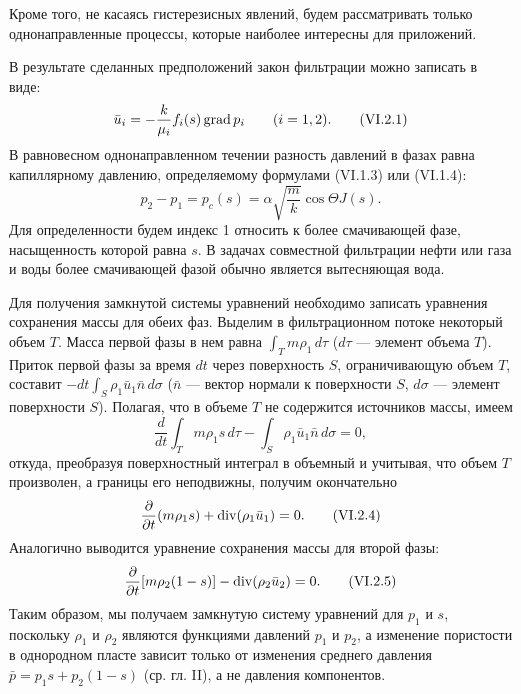 Кроме того, не касаясь гистерезисных явлений, будем рассматривать только однонаправленные процессы, которые наиболее интересны для приложений.

В результате сделанных предположений закон фильтрации можно записать в виде:
\begin{equation}\bar u_i=-\frac{k}{\mu_i}f_i(s)\operatorname{grad} p_i\qquad(i=1,2).\tag{VI.2.1}\label{q11:eq-VI-2-1}\end{equation}
В равновесном однонаправленном течении разность давлений в фазах равна капиллярному давлению, определяемому формулами (VI.1.3) или (VI.1.4):
\begin{equation}p_2-p_1=p_c(s)=\alpha\sqrt{\frac{m}{k}}\cos\Theta J(s).\tag{VI.2.2}\label{q11:eq-VI-2-2}\end{equation}
Для определенности будем индекс 1 относить к более смачивающей фазе, насыщенность которой равна $s$. В задачах совместной фильтрации нефти или газа и воды более смачивающей фазой обычно является вытесняющая вода.

Для получения замкнутой системы уравнений необходимо записать уравнения сохранения массы для обеих фаз. Выделим в фильтрационном потоке некоторый объем $T$. Масса первой фазы в нем равна $\int_Tm\rho_1\,d\tau$ ($d\tau$ --- элемент объема $T$). Приток первой фазы за время $dt$ через поверхность $S$, ограничивающую объем $T$, составит $-dt\int_S\rho_1\bar u_1\bar n\,d\sigma$ ($\bar n$ --- вектор нормали к поверхности $S$, $d\sigma$ --- элемент поверхности $S$). Полагая, что в объеме $T$ не содержится источников массы, имеем
\begin{equation}\frac{d}{dt}\int_Tm\rho_1s\,d\tau-\int_S\rho_1\bar u_1\bar n\,d\sigma=0,\tag{VI.2.3}\label{q11:eq-VI-2-3}\end{equation}
откуда, преобразуя поверхностный интеграл в объемный и учитывая, что объем $T$ произволен, а границы его неподвижны, получим окончательно
\begin{equation}\frac{\partial}{\partial t}(m\rho_1s)+\operatorname{div}(\rho_1\bar u_1)=0.\tag{VI.2.4}\label{q11:eq-VI-2-4}\end{equation}
Аналогично выводится уравнение сохранения массы для второй фазы:
\begin{equation}\frac{\partial}{\partial t}[m\rho_2(1-s)]-\operatorname{div}(\rho_2\bar u_2)=0.\tag{VI.2.5}\label{q11:eq-VI-2-5}\end{equation}
Таким образом, мы получаем замкнутую систему уравнений для $p_1$ и $s$, поскольку $\rho_1$ и $\rho_2$ являются функциями давлений $p_1$ и $p_2$, а изменение пористости в однородном пласте зависит только от изменения среднего давления $\bar p=p_1s+p_2(1-s)$ (ср. гл. II), а не давления компонентов.

